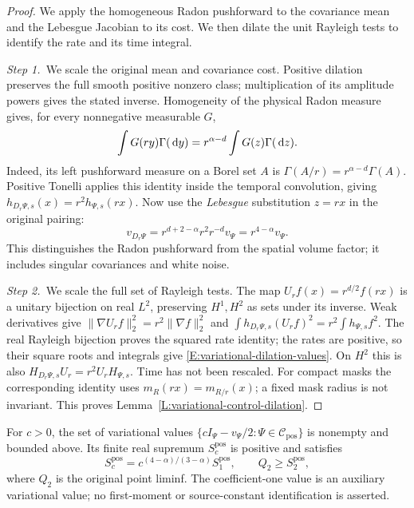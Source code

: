 \begin{proof}
  We apply the homogeneous Radon pushforward to the covariance mean and the
  Lebesgue Jacobian to its cost. We then dilate the unit Rayleigh tests to
  identify the rate and its time integral.


  \medskip
  \noindent\textit{Step 1.~}We scale the original mean and covariance cost.
  Positive dilation preserves the full smooth positive nonzero class;
  multiplication of its amplitude powers gives the stated inverse. Homogeneity
  of the physical Radon measure gives, for every nonnegative measurable $G$,
  \[
    \int G(ry)\Gamma(\,\mathrm{d} y)
    =r^{\alpha-d}\int G(z)\Gamma(\,\mathrm{d} z).
  \]
  Indeed, its left pushforward measure on a Borel set $A$ is $\Gamma(A/r) =
  r^{\alpha-d}\Gamma(A)$. Positive Tonelli applies this identity inside the
  temporal convolution, giving $h_{D_r\Psi,s}(x) = r^2h_{\Psi,s}(rx)$. Now use
  the \emph{Lebesgue} substitution $z = rx$ in the original pairing:
  \[
    v_{D_r\Psi}=r^{d+2-\alpha}r^2r^{-d}v_\Psi
    =r^{4-\alpha}v_\Psi.
  \]
  This distinguishes the Radon pushforward from the spatial volume factor; it
  includes singular covariances and white noise.


  \medskip
  \noindent\textit{Step 2.~}We scale the full set of Rayleigh tests.
  The map $U_rf(x) = r^{d/2}f(rx)$ is a unitary bijection on real $L^2$,
  preserving $H^1,H^2$ as sets under its inverse. Weak derivatives give
  $\|\nabla U_rf\|_2^2 = r^2\|\nabla f\|_2^2$ and $\int h_{D_r\Psi,s}(U_rf)^2 =
  r^2\int h_{\Psi,s}f^2$. The real Rayleigh bijection proves the squared rate
  identity; the rates are positive, so their square roots and integrals give
  \eqref{E:variational-dilation-values}. On $H^2$ this is also $H_{D_r\Psi,s}U_r
  = r^2U_rH_{\Psi,s}$. Time has not been rescaled. For compact masks the
  corresponding identity uses $m_R(rx) = m_{R/r}(x)$; a fixed mask radius is not
  invariant. This proves Lemma~\ref{L:variational-control-dilation}.
\end{proof}

\begin{proposition}
  \label{P:variational-positive-scores}
  For $c > 0$, the set of variational values
  $\{cI_\Psi-v_\Psi/2:\Psi\in\mathcal{C}_{\mathrm{pos}}\}$ is nonempty and
  bounded above. Its finite real supremum $S_c^{\mathrm{pos}}$ is positive and
  satisfies
  \begin{equation}\label{E:variational-score-homogeneity}
    S_c^{\mathrm{pos}}=c^{(4-\alpha)/(3-\alpha)}S_1^{\mathrm{pos}},
    \qquad
    Q_2\ge S_2^{\mathrm{pos}},
  \end{equation}
  where $Q_2$ is the original point liminf. The coefficient-one value is an
  auxiliary variational value; no first-moment or source-constant identification
  is asserted.
\end{proposition}

